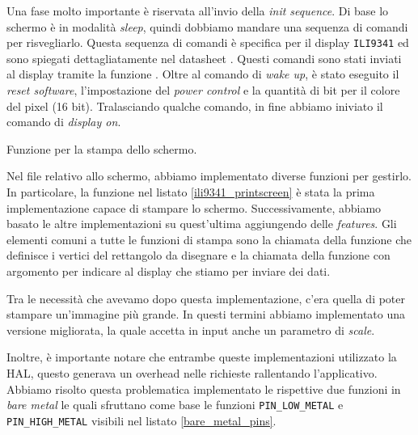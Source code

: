 \documentclass[a4paper]{article}
\begin{document}
Una fase molto importante è riservata all'invio della \textit{init sequence}.
Di base lo schermo è in modalità \textit{sleep}, quindi dobbiamo mandare una sequenza di
comandi per risvegliarlo. Questa sequenza di comandi è specifica per il display \texttt{ILI9341}
ed sono spiegati dettagliatamente nel datasheet \cite{ili9341}. Questi comandi sono stati
inviati al display tramite la funzione
{}.
Oltre al comando di \textit{wake up}, è stato eseguito il \textit{reset software},
l'impostazione del \textit{power control} e la quantità di bit per il colore del pixel (16 bit).
Tralasciando qualche comando, in fine abbiamo iniviato il comando di \textit{display on}.

\begin{Listing}[h!t] %
    \centering
    \caption{Funzione per la stampa dello schermo.}
    \label{ili9341_printscreen}
\end{Listing}

Nel file relativo allo schermo, abbiamo implementato diverse funzioni per gestirlo.
In particolare, la funzione nel listato \ref{ili9341_printscreen} è stata la prima
implementazione capace di stampare lo schermo. Successivamente, abbiamo basato le altre
implementazioni su quest'ultima aggiungendo delle \textit{features}.
Gli elementi comuni a tutte le funzioni di stampa sono la chiamata della funzione
{} che definisce i vertici
del rettangolo da disegnare e la chiamata della funzione  con argomento
{} per indicare al display
che stiamo per inviare dei dati.

Tra le necessità che avevamo dopo questa implementazione, c'era quella di poter stampare
un'immagine più grande. In questi termini abbiamo implementato una versione migliorata,
la quale accetta in input anche un parametro di \textit{scale}.

Inoltre, è importante notare che entrambe queste implementazioni utilizzato la HAL, questo
generava un overhead nelle richieste rallentando l'applicativo. Abbiamo risolto questa
problematica implementato le rispettive due funzioni in \textit{bare metal} le quali
sfruttano come base le funzioni \texttt{PIN\_LOW\_METAL} e \texttt{PIN\_HIGH\_METAL}
visibili nel listato \ref{bare_metal_pins}.
\end{document}
